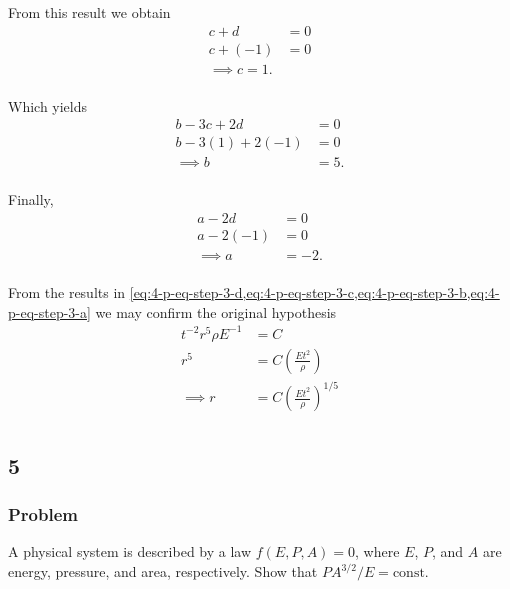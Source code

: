 \documentclass[12pt]{article}
\begin{document}
  From this result we obtain
  \begin{equation}
    \label{eq:4-p-eq-step-3-c}
    \begin{aligned}
      c+d &= 0 \\
      c + (-1) &= 0 \\
      \implies c = 1. \\
    \end{aligned}
  \end{equation}

  Which yields
  \begin{equation}
    \label{eq:4-p-eq-step-3-b}
    \begin{aligned}
      b - 3c + 2d &= 0 \\
      b - 3(1) + 2(-1) &= 0 \\
      \implies b &= 5. \\
    \end{aligned}
  \end{equation}

  Finally,
  \begin{equation}
    \label{eq:4-p-eq-step-3-a}
    \begin{aligned}
      a - 2d &= 0 \\
      a - 2(-1) &= 0 \\
      \implies a &= -2. \\
    \end{aligned}
  \end{equation}

  From the results in
  \cref{eq:4-p-eq-step-3-d,eq:4-p-eq-step-3-c,eq:4-p-eq-step-3-b,eq:4-p-eq-step-3-a}
  we may confirm the original hypothesis
  \begin{equation} \boxed{
    \begin{aligned}
      t^{-2} r^{5} \rho E^{-1} &= C \\
      r^5 &= C\left(\frac{Et^2}{\rho}\right) \\
      \implies r &= C\left(\frac{Et^2}{\rho}\right)^{1/5} \\
    \end{aligned}
    }
  \end{equation}

\subsection{5}
  \subsubsection*{Problem}
  A physical system is described by a law $f(E,P,A)=0$, where $E$, $P$, and $A$
  are energy, pressure, and area, respectively. Show that $PA^{3/2}/E=\text{const}$.
\end{document}
